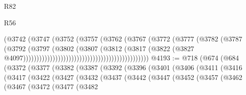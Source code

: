\begin{lexlean}{R82}
\begin{lexlean}{R56}
\begin{coremodule}
{{{{{{{{{{{{{{{{{{{{{{{{{{{{{{{{{{{{{{{{{{{{{{{{{{{{{{{{{{{{{{{{{{{{{{{{{{{{{{{{{{{{{{{{{{{{{{{{{{{{{{{{{{{{{{{{{{{{{{{{{{{{{{{{{{{{{{{{{{{{{{{{{{{{{{{{{{{{{{{{{{{{{{{{{{{{{{{{{{{{{{{{{{{{{{{{{{{{{{{{{{{{{{{{{{{                                                              (@3742
                                                                (@3747
                                                                  (@3752
                                                                    (@3757
                                                                      (@3762
                                                                        (@3767
                                                                          (@3772
                                                                            (@3777
                                                                              (@3782
                                                                                (@3787
                                                                                  (@3792
                                                                                    (@3797
                                                                                      (@3802
                                                                                        (@3807
                                                                                          (@3812
                                                                                            (@3817
                                                                                              (@3822
                                                                                                (@3827
                                                                                                  @4097)))))))))))))))))))))))))))))))))))))))))))))))
@4193 := @718
    (@674
      (@684
        (@3372
          (@3377
            (@3382
              (@3387
                (@3392
                  (@3396
                    (@3401
                      (@3406
                        (@3411
                          (@3416
                            (@3417
                              (@3422
                                (@3427
                                  (@3432
                                    (@3437
                                      (@3442
                                        (@3447
                                          (@3452
                                            (@3457
                                              (@3462
                                                (@3467
                                                  (@3472
                                                    (@3477
                                                      (@3482
}}}}}}}}}}}}}}}}}}}}}}}}}}}}}}}}}}}}}}}}}}}}}}}}}}}}}}}}}}}}}}}}}}}}}}}}}}}}}}}}}}}}}}}}}}}}}}}}}}}}}}}}}}}}}}}}}}}}}}}}}}}}}}}}}}}}}}}}}}}}}}}}}}}}}}}}}}}}}}}}}}}}}}}}}}}}}}}}}}}}}}}}}}}}}}}}}}}}}}}}}}}}}}}}}}}
\end{coremodule}
\end{lexlean}
\end{lexlean}
